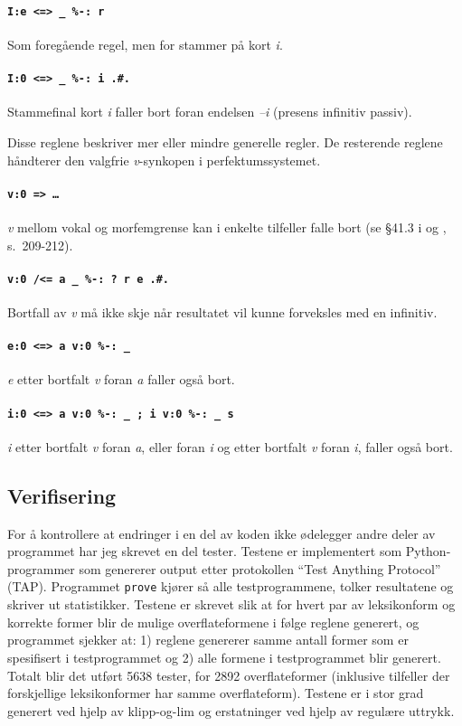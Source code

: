 \documentclass{article}
\newcommand\note[1]{\marginpar{\raggedright\tiny#1}}
\let\code\texttt
\let\prog\texttt
\let\w\emph
\begin{document}
\paragraph{\code{I:e <=> \_ \%-: r}} Som foreg\aa{}ende regel, men for
stammer p\aa{} kort \w{i}.

\paragraph{\code{I:0 <=> \_ \%-: i .\#.}} Stammefinal kort \w{i} faller bort
foran endelsen \w{--i} (presens infinitiv passiv).

Disse reglene beskriver mer eller mindre generelle regler. De resterende
reglene h\aa{}ndterer den valgfrie \w{v}-synkopen i perfektumssystemet.

\paragraph{\code{v:0 => \ldots}} \w{v} mellom vokal og morfemgrense kan i
enkelte tilfeller falle bort (se \S 41.3 i  og ,
s.~209-212).

\paragraph{\code{v:0 /<= a \_ \%-: ? r e .\#.}} Bortfall av \w{v} m\aa{}
ikke skje n\aa{}r resultatet vil kunne forveksles med en infinitiv.

\paragraph{\code{e:0 <=> a v:0 \%-: \_}} \w{e} etter bortfalt \w{v} foran
\w{a} faller ogs\aa{} bort.

\paragraph{\code{i:0 <=> a v:0 \%-: \_ ; i v:0 \%-: \_ s}} \w{i} etter
bortfalt \w{v} foran \w{a}, eller foran \w{i} og etter bortfalt \w{v} foran
\w{i}, faller ogs\aa{} bort.

\subsection{Verifisering}
For \aa{} kontrollere at endringer i en del av koden ikke \o{}delegger andre
deler av programmet har jeg skrevet en del tester. Testene er implementert som
Python-programmer som genererer output etter protokollen ``Test Anything
Protocol'' (TAP). Programmet \prog{prove} kj\o{}rer s\aa{} alle
testprogrammene, tolker resultatene og skriver ut statistikker. Testene er
skrevet slik at for hvert par av leksikonform og korrekte former blir de
mulige overflateformene i f\o{}lge reglene generert, og programmet sjekker at:
1) reglene genererer samme antall former som er spesifisert i testprogrammet
og 2) alle formene i testprogrammet blir generert. Totalt blir det utf\o{}rt
5638 tester, for 2892 overflateformer \note{Disse tallene m\aa{} oppdateres!}
(inklusive tilfeller der forskjellige leksikonformer har samme overflateform).
Testene er i stor grad generert ved hjelp av klipp-og-lim og erstatninger ved
hjelp av regul\ae{}re uttrykk.
\end{document}
